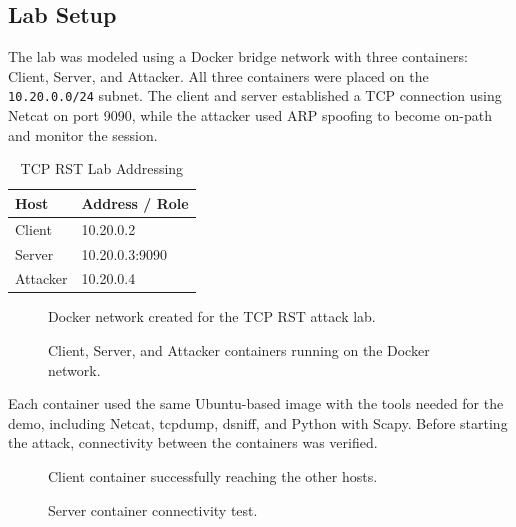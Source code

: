 \subsection{Lab Setup}

The lab was modeled using a Docker bridge network with three containers: Client, Server, and Attacker. All three containers were placed on the \texttt{10.20.0.0/24} subnet. The client and server established a TCP connection using Netcat on port 9090, while the attacker used ARP spoofing to become on-path and monitor the session.

\begin{table}[H]
\centering
\caption{TCP RST Lab Addressing}
\label{tab:rst_addresses}
\begin{tabular}{|l|l|}
\hline
\textbf{Host} & \textbf{Address / Role} \\
\hline
Client & 10.20.0.2 \\
Server & 10.20.0.3:9090 \\
Attacker & 10.20.0.4 \\
\hline
\end{tabular}
\end{table}

\begin{figure}[!t]
\centering
{}
\caption{Docker network created for the TCP RST attack lab.}
\label{fig:rst_network}
\end{figure}

\begin{figure}[!t]
\centering
{}
\caption{Client, Server, and Attacker containers running on the Docker network.}
\label{fig:rst_containers}
\end{figure}

Each container used the same Ubuntu-based image with the tools needed for the demo, including Netcat, tcpdump, dsniff, and Python with Scapy. Before starting the attack, connectivity between the containers was verified.

\begin{figure}[!t]
\centering
{}
\caption{Client container successfully reaching the other hosts.}
\label{fig:rst_client_ping}
\end{figure}

\begin{figure}[!t]
\centering
{}
\caption{Server container connectivity test.}
\label{fig:rst_server_ping}
\end{figure}

